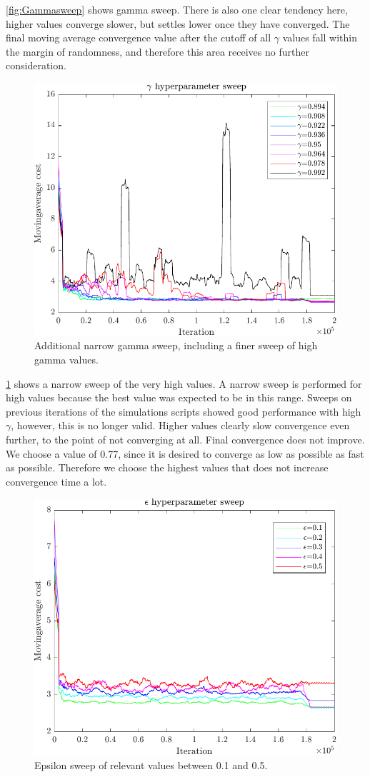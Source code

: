 \cref{fig:Gammasweep} shows gamma sweep. There is also one clear tendency here, higher values converge slower, but settles lower once they have converged. The final moving average convergence value after the cutoff of all  $\gamma$ values fall within the margin of randomness, and therefore this area receives no further consideration.

\begin{figure}[h!]
	\centering
	\includegraphics[width=0.7\linewidth]{figures/GammaSweepTabRealHNarrow.pdf}
	\caption{Additional narrow gamma sweep, including a finer sweep of high gamma values.}
	\label{fig:GammaSweepTabularNarrow}
\end{figure} 

\cref{fig:GammaSweepTabularNarrow} shows a narrow sweep of the very high values. A narrow sweep is performed for high values because the best value was expected to be in this range. Sweeps on previous iterations of the simulations scripts showed good performance with high $\gamma$, however, this is no longer valid. Higher values clearly slow convergence even further, to the point of not converging at all. Final convergence does not improve.
We choose a value of 0.77, since it is desired to converge as low as possible as fast as possible. Therefore we choose the highest values that does not increase convergence time a lot.

\begin{figure}[h!]
	\centering
	\includegraphics[width=0.7\linewidth]{figures/EpsilonSweepTabRealHWide.pdf}
	\caption{Epsilon sweep of relevant values between 0.1 and 0.5.}
	\label{fig:EpsilonSweepTabular}
\end{figure} 


